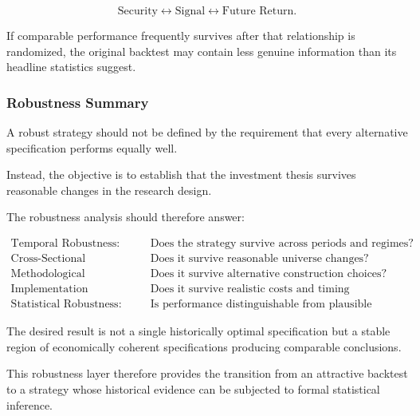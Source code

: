 \documentclass[11pt,a4paper]{article}
\begin{document}
\begin{equation}
\boxed{
\text{Security}
\leftrightarrow
\text{Signal}
\leftrightarrow
\text{Future Return}.
}
\end{equation}

If comparable performance frequently survives after that relationship is
randomized, the original backtest may contain less genuine information than its
headline statistics suggest.


\subsubsection{Robustness Summary}

A robust strategy should not be defined by the requirement that every
alternative specification performs equally well.

Instead, the objective is to establish that the investment thesis survives
reasonable changes in the research design.

The robustness analysis should therefore answer:

\begin{equation}
\boxed{
\begin{aligned}
\text{Temporal Robustness:}
&\quad
\text{Does the strategy survive across periods and regimes?}
\\
\text{Cross-Sectional Robustness:}
&\quad
\text{Does it survive reasonable universe changes?}
\\
\text{Methodological Robustness:}
&\quad
\text{Does it survive alternative construction choices?}
\\
\text{Implementation Robustness:}
&\quad
\text{Does it survive realistic costs and timing assumptions?}
\\
\text{Statistical Robustness:}
&\quad
\text{Is performance distinguishable from plausible randomized outcomes?}
\end{aligned}
}
\end{equation}

The desired result is not a single historically optimal specification but a
stable region of economically coherent specifications producing comparable
conclusions.

This robustness layer therefore provides the transition from an attractive
backtest to a strategy whose historical evidence can be subjected to formal
statistical inference.
\end{document}
